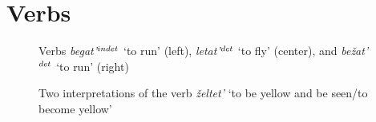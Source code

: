 \section{Verbs}\label{app:verbs}
\begin{figure}[H]
\hfill%
\hfill%
%
\caption{Verbs \textit{begat'}$^{\normalfont indet}$ `to run' (left), \textit{letat'}$^{\normalfont det}$ `to fly' (center), and \textit{be\v{z}at'}$^{\normalfont det}$ `to run' (right)}
\end{figure}

\begin{figure}[H]\small
\hfill%
%
\caption{Two interpretations of the verb \textit{\v{z}eltet'} `to be yellow and be seen/to become yellow' \label{app:zeltet}}
\end{figure}

